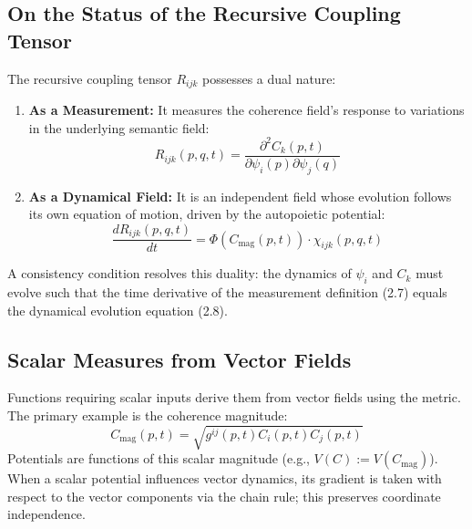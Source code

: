 \subsection{On the Status of the Recursive Coupling Tensor}

The recursive coupling tensor \(R_{ijk}\) possesses a dual nature:
\begin{enumerate}
    \item \textbf{As a Measurement:} It measures the coherence field's response to variations in the underlying semantic field:
    \begin{equation}
    R_{ijk}(p, q, t) = \frac{\partial^2 C_k(p,t)}{\partial \psi_i(p) \partial \psi_j(q)}
    \end{equation}
    \item \textbf{As a Dynamical Field:} It is an independent field whose evolution follows its own equation of motion, driven by the autopoietic potential:
    \begin{equation}
    \frac{dR_{ijk}(p,q,t)}{dt} = \Phi(C_{\mathrm{mag}}(p,t)) \cdot \chi_{ijk}(p,q,t)
    \end{equation}
\end{enumerate}
A consistency condition resolves this duality: the dynamics of \(\psi_i\) and \(C_k\) must evolve such that the time derivative of the measurement definition (2.7) equals the dynamical evolution equation (2.8).

\subsection{Scalar Measures from Vector Fields}

Functions requiring scalar inputs derive them from vector fields using the metric. The primary example is the coherence magnitude:
\begin{equation}
C_{\mathrm{mag}}(p,t) = \sqrt{g^{ij}(p,t) C_i(p,t) C_j(p,t)}
\end{equation}
Potentials are functions of this scalar magnitude (e.g., \(V(C) := V(C_{\mathrm{mag}})\)). When a scalar potential influences vector dynamics, its gradient is taken with respect to the vector components via the chain rule; this preserves coordinate independence. 